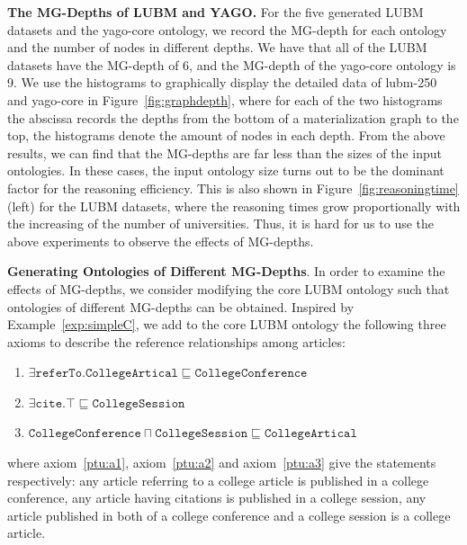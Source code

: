 \textbf{The MG-Depths of LUBM and YAGO.}
For the five generated LUBM datasets and the yago-core ontology, we record the MG-depth
for each ontology and the number of nodes in different depths.
We have that all of the LUBM datasets have the MG-depth of 6,
and the MG-depth of the yago-core ontology is 9.
We use the histograms to graphically display the detailed data of lubm-250 and yago-core in Figure~\ref{fig:graphdepth},
where for each of the two histograms
the abscissa records the depths from the bottom of a materialization graph to the top,
the histograms denote the amount of nodes in each depth.
%
From the above results, we can find that the MG-depths are far less than
the sizes of the input ontologies. In these cases, the input ontology size
turns out to be the dominant factor for the reasoning efficiency.
This is also shown in Figure~\ref{fig:reasoningtime}(left) for the LUBM datasets,
where the reasoning times grow proportionally with the increasing of the number
of universities.
%
Thus, it is hard for us to use the above experiments to
observe the effects of MG-depths.

\textbf{Generating Ontologies of Different MG-Depths}.
In order to examine the effects of MG-depths, we consider modifying the core LUBM ontology
such that ontologies of different MG-depths can be obtained.
Inspired by Example~\ref{exp:simpleC},
we add to the core LUBM ontology the following three axioms to
describe the reference relationships among articles:
\begin{enumerate}[leftmargin=8ex,label=($\beta_{\arabic*}$),ref=$\beta_{\arabic*}$]
  \item $\exists\texttt{referTo}.\texttt{CollegeArtical}\sqsubseteq\texttt{CollegeConference}$\label{ptu:a1}
  \item $\exists\texttt{cite}.\top\sqsubseteq\texttt{CollegeSession}$\label{ptu:a2}
  \item $\texttt{CollegeConference}\sqcap\texttt{CollegeSession}\sqsubseteq\texttt{CollegeArtical}$\label{ptu:a3}
\end{enumerate}
where axiom~\ref{ptu:a1}, axiom~\ref{ptu:a2} and axiom~\ref{ptu:a3} give the
statements respectively: any article referring to a college article is published in a
college conference, any article having citations is published in a college session,
any article published in both of a college conference and a college session is
a college article.

